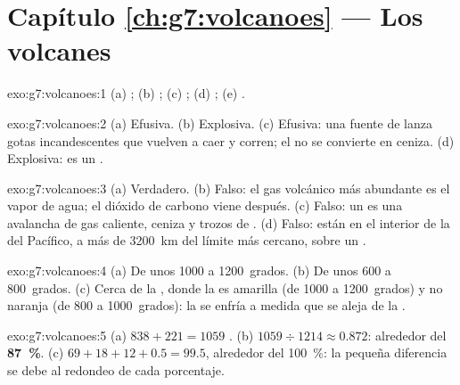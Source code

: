 \section*{Capítulo \ref{ch:g7:volcanoes} --- Los volcanes}

\begin{solution}{exo:g7:volcanoes:1}
(a) ; (b) ; (c) ; (d) ; (e) .
\end{solution}

\begin{solution}{exo:g7:volcanoes:2}
(a) Efusiva. (b) Explosiva. (c) Efusiva: una fuente de  lanza gotas
incandescentes que vuelven a caer y corren; el  no se convierte en
ceniza. (d) Explosiva: es un .
\end{solution}

\begin{solution}{exo:g7:volcanoes:3}
(a) Verdadero. (b) Falso: el gas volcánico más abundante es el vapor de
agua; el dióxido de carbono viene después. (c) Falso: un 
es una avalancha de gas caliente, ceniza y trozos de . (d) Falso: están
en el interior de la  del Pacífico, a más de 3200~km del límite más
cercano, sobre un .
\end{solution}

\begin{solution}{exo:g7:volcanoes:4}
(a) De unos 1000 a 1200~grados. (b) De unos 600 a 800~grados. (c) Cerca de
la , donde la  es amarilla (de 1000 a 1200~grados) y no naranja (de
800 a 1000~grados): la  se enfría a medida que se aleja de la .
\end{solution}

\begin{solution}{exo:g7:volcanoes:5}
(a) $838 + 221 = 1059$ . (b) $1059 \div 1214 \approx 0.872$:
alrededor del \textbf{87~\%}. (c) $69 + 18 + 12 + 0.5 = 99.5$, alrededor
del 100~\%: la pequeña diferencia se debe al redondeo de cada porcentaje.
\end{solution}

